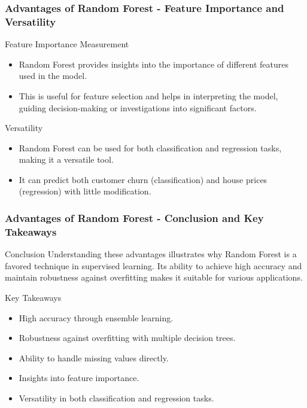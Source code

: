 \documentclass[aspectratio=169]{beamer}
\begin{document}
\begin{frame}[fragile]
    \frametitle{Advantages of Random Forest - Feature Importance and Versatility}
    \begin{block}{Feature Importance Measurement}
        \begin{itemize}
            \item Random Forest provides insights into the importance of different features used in the model.
            \item This is useful for feature selection and helps in interpreting the model, guiding decision-making or investigations into significant factors.
        \end{itemize}
    \end{block}
    \begin{block}{Versatility}
        \begin{itemize}
            \item Random Forest can be used for both classification and regression tasks, making it a versatile tool.
            \item It can predict both customer churn (classification) and house prices (regression) with little modification.
        \end{itemize}
    \end{block}
\end{frame}

\begin{frame}[fragile]
    \frametitle{Advantages of Random Forest - Conclusion and Key Takeaways}
    \begin{block}{Conclusion}
        Understanding these advantages illustrates why Random Forest is a favored technique in supervised learning. Its ability to achieve high accuracy and maintain robustness against overfitting makes it suitable for various applications.
    \end{block}
    \begin{block}{Key Takeaways}
        \begin{itemize}
            \item High accuracy through ensemble learning.
            \item Robustness against overfitting with multiple decision trees.
            \item Ability to handle missing values directly.
            \item Insights into feature importance.
            \item Versatility in both classification and regression tasks.
        \end{itemize}
    \end{block}
\end{frame}
\end{document}

